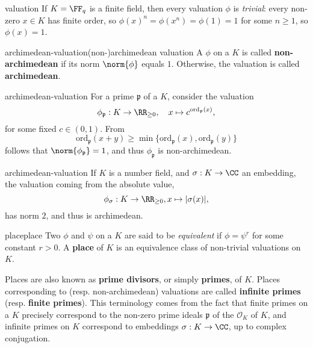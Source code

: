 \begin{example}{valuation}
    If $K = \FF_q$ is a finite field, then every valuation $\phi$ is \textit{trivial}: every non-zero $x \in K$ has finite order, so $\phi(x)^n = \phi(x^n) = \phi(1) = 1$ for some $n \ge 1$, so $\phi(x) = 1$.
\end{example}

\begin{topic}{archimedean-valuation}{(non-)archimedean valuation}
    A  $\phi$ on a  $K$ is called \textbf{non-archimedean} if its norm $\norm{\phi}$ equals $1$. Otherwise, the valuation is called \textbf{archimedean}.
\end{topic}

\begin{example}{archimedean-valuation}
    For a prime $\mathfrak{p}$ of a  $K$, consider the valuation
    \[ \phi_\mathfrak{p} : K \to \RR_{\ge 0}, \quad x \mapsto c^{\text{ord}_\mathfrak{p}(x)} , \]
    for some fixed $c \in (0, 1)$. From
    \[ \text{ord}_\mathfrak{p}(x + y) \ge \min \{ \text{ord}_\mathfrak{p}(x), \text{ord}_\mathfrak{p}(y) \} \]
    follows that $\norm{\phi_\mathfrak{p}} = 1$, and thus $\phi_\mathfrak{p}$ is non-archimedean.
\end{example}

\begin{example}{archimedean-valuation}
    If $K$ is a number field, and $\sigma : K \to \CC$ an embedding, the valuation coming from the absolute value,
    \[ \phi_\sigma : K \to \RR_{\ge 0}, x \mapsto |\sigma(x)| , \]
    has norm $2$, and thus is archimedean.
\end{example}

\begin{topic}{place}{place}
    Two  $\phi$ and $\psi$ on a  $K$ are said to be \textit{equivalent} if $\phi = \psi^r$ for some constant $r > 0$. A \textbf{place} of $K$ is an equivalence class of non-trivial valuations on $K$.
    
    Places are also known as \textbf{prime divisors}, or simply \textbf{primes}, of $K$. Places corresponding to  (resp. non-archimedean) valuations are called \textbf{infinite primes} (resp. \textbf{finite primes}). This terminology comes from the fact that finite primes on a  $K$ precisely correspond to the non-zero prime ideals $\mathfrak{p}$ of the  $\mathcal{O}_K$ of $K$, and infinite primes on $K$ correspond to embeddings $\sigma : K \to \CC$, up to complex conjugation.
\end{topic}

